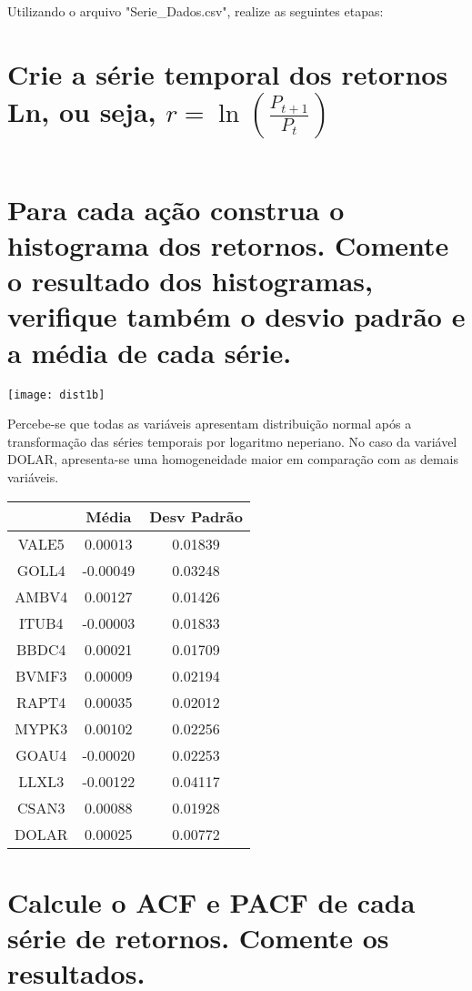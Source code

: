 Utilizando o arquivo "Serie\_Dados.csv", realize as seguintes etapas:

\section{Crie a série temporal dos retornos Ln, ou seja, $r=\ln(\frac{P_{t+1}}{P_{t}})$}

\inputminted{R}{Src/R/ex1a.R}

\section{Para cada ação construa o histograma dos retornos. Comente o resultado dos histogramas, verifique também o desvio padrão e a média de cada série.}

\begin{center}
\begin{centering}
\texttt{[image: dist1b]}
\par\end{centering}
\par\end{center}

Percebe-se que todas as variáveis apresentam distribuição normal após a transformação das séries temporais por logaritmo neperiano. No caso da variável DOLAR, apresenta-se uma homogeneidade maior em comparação com as demais variáveis.


\begin{center}
\begin{tabular}{c|c|c}
\hline 
 & Média & Desv Padrão\tabularnewline
\hline 
VALE5 & 0.00013 & 0.01839\tabularnewline
\hline 
GOLL4 & -0.00049 & 0.03248\tabularnewline
\hline 
AMBV4 & 0.00127 & 0.01426\tabularnewline
\hline 
ITUB4 & -0.00003 & 0.01833\tabularnewline
\hline 
BBDC4 & 0.00021 & 0.01709\tabularnewline
\hline 
BVMF3 & 0.00009 & 0.02194\tabularnewline
\hline 
RAPT4 & 0.00035 & 0.02012\tabularnewline
\hline 
MYPK3 & 0.00102 & 0.02256\tabularnewline
\hline 
GOAU4 & -0.00020 & 0.02253\tabularnewline
\hline 
LLXL3 & -0.00122 & 0.04117\tabularnewline
\hline 
CSAN3 & 0.00088 & 0.01928\tabularnewline
\hline 
DOLAR & 0.00025 & 0.00772\tabularnewline
\hline 
\end{tabular}
\par\end{center}


\section{Calcule o ACF e PACF de cada série de retornos. Comente os resultados.}

